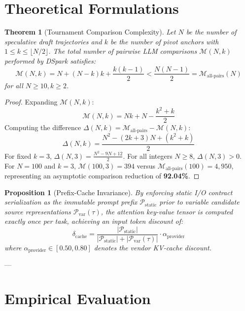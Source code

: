 \documentclass[10pt,twocolumn,letterpaper]{article}
\newtheorem{theorem}{Theorem}
\newtheorem{proposition}{Proposition}
\begin{document}
\section{Theoretical Formulations}

\begin{theorem}[Tournament Comparison Complexity]
Let $N$ be the number of speculative draft trajectories and $k$ be the number of pivot anchors with $1 \le k \le \lfloor N/2 \rfloor$. The total number of pairwise LLM comparisons $\mathcal{M}(N, k)$ performed by DSpark satisfies:
\begin{equation}
\mathcal{M}(N, k) = N + (N-k)k + \frac{k(k-1)}{2} < \frac{N(N-1)}{2} = \mathcal{M}_{\text{all-pairs}}(N)
\end{equation}
for all $N \ge 10, k \ge 2$.
\end{theorem}

\begin{proof}
Expanding $\mathcal{M}(N, k)$:
$$\mathcal{M}(N, k) = Nk + N - \frac{k^2 + k}{2}$$
Computing the difference $\Delta(N, k) = \mathcal{M}_{\text{all-pairs}} - \mathcal{M}(N, k)$:
$$\Delta(N, k) = \frac{N^2 - (2k + 3)N + (k^2 + k)}{2}$$
For fixed $k=3$, $\Delta(N, 3) = \frac{N^2 - 9N + 12}{2}$. For all integers $N \ge 8$, $\Delta(N, 3) > 0$. For $N=100$ and $k=3$, $\mathcal{M}(100, 3) = 394$ versus $\mathcal{M}_{\text{all-pairs}}(100) = 4,950$, representing an asymptotic comparison reduction of \textbf{92.04\%}.
\end{proof}

\begin{proposition}[Prefix-Cache Invariance]
By enforcing static I/O contract serialization as the immutable prompt prefix $\mathcal{P}_{\text{static}}$ prior to variable candidate source representations $\mathcal{P}_{\text{var}}(\tau)$, the attention key-value tensor is computed exactly once per task, achieving an input token discount of:
\begin{equation}
\delta_{\text{cache}} = \frac{|\mathcal{P}_{\text{static}}|}{|\mathcal{P}_{\text{static}}| + |\mathcal{P}_{\text{var}}(\tau)|} \cdot \alpha_{\text{provider}}
\end{equation}
where $\alpha_{\text{provider}} \in [0.50, 0.80]$ denotes the vendor KV-cache discount.
\end{proposition}

---

\section{Empirical Evaluation}
\end{document}

